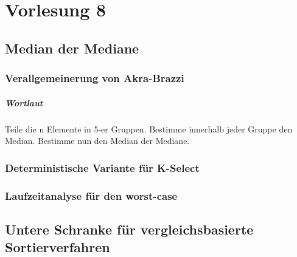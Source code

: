 \chapter{Vorlesung 8}

\section{Median der Mediane}

\subsection{Verallgemeinerung von Akra-Brazzi}

\paragraph{Wortlaut}
Teile die n Elemente in 5-er Gruppen. Bestimme innerhalb jeder Gruppe den Median. Bestimme nun den Median der Mediane.


\subsection{Deterministische Variante für K-Select}

\subsection{Laufzeitanalyse für den worst-case}


\section{Untere Schranke für vergleichsbasierte Sortierverfahren}